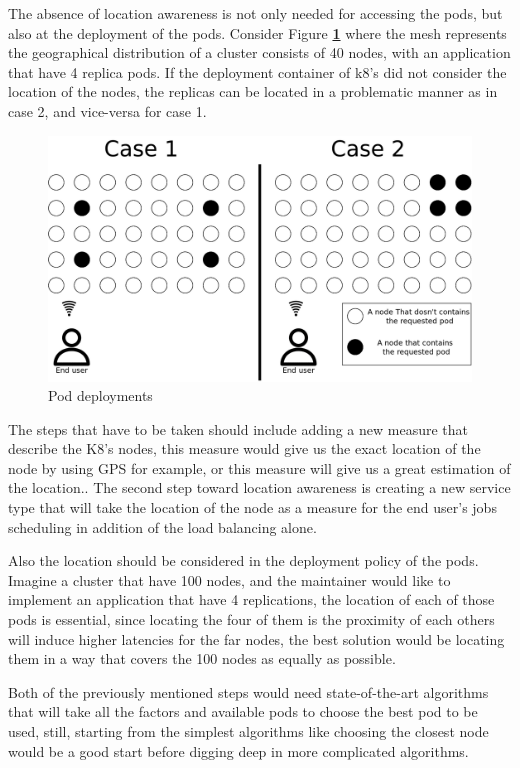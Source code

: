 \documentclass[letterpaper,twocolumn,10pt]{article}
\let\origref\ref
\def\ref#1{\textbf{\origref{#1}}}
\begin{document}
The absence of location awareness is not only needed for accessing the pods, but also at the deployment of the pods. Consider Figure \ref{fig:dep} where the mesh represents the geographical distribution of a cluster consists of 40 nodes, with an application that have 4 replica pods. If the deployment container of k8's did not consider the location of the nodes, the replicas can be located in a problematic manner as in case 2, and vice-versa for case 1. 

\begin{figure}[tbp]
  \centering
  \includegraphics[width=.9\linewidth]{images/dep.png}
  \caption{Pod deployments}
  \label{fig:dep}
\end{figure}


The steps that have to be taken should include adding a new measure that describe the K8's nodes, this measure would give us the exact location of the node by using GPS for example, or this measure will give us a great estimation of the location.. 
The second step toward location awareness is creating a new service type that will take the location of the node as a measure for the end user's jobs scheduling in addition of the load balancing alone.

Also the location should be considered in the deployment policy of the pods. Imagine a cluster that have 100 nodes, and the maintainer would like to implement an application that have 4 replications, the location of each of those pods is essential, since locating the four of them is the proximity of each others will induce higher latencies for the far nodes, the best solution would be locating them in a way that covers the 100 nodes as equally as possible. 

Both of the previously mentioned steps would need state-of-the-art algorithms that will take all the factors and available pods to choose the best pod to be used, still, starting from the simplest algorithms like choosing the closest node would be a good start before digging deep in more complicated algorithms.
\end{document}
